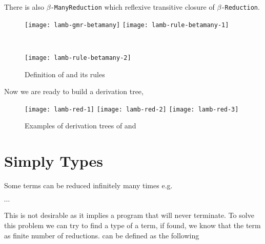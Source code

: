 \documentclass[master.tex]{subfiles}
\begin{document}
\newpage

There is also \texttt{$\beta$-ManyReduction} which reflexive transitive closure
of \texttt{$\beta$-Reduction}.

\begin{figure}[H]
    \centering
\begin{minipage}{0.48\textwidth}
\begin{flushleft}
\texttt{[image: lamb-gmr-betamany]}
\texttt{[image: lamb-rule-betamany-1]}
\end{flushleft}
\end{minipage}
~
\begin{minipage}{0.48\textwidth}
\begin{flushright}
\texttt{[image: lamb-rule-betamany-2]}
\end{flushright}
\end{minipage}

\caption{Definition of  and its rules}
\end{figure}

Now we are ready to build a derivation tree,

\begin{figure}[H]
    \centering
\begin{minipage}{\textwidth}
    \texttt{[image: lamb-red-1]}
    \texttt{[image: lamb-red-2]}
    \texttt{[image: lamb-red-3]}
\end{minipage}
\caption{Examples of derivation trees of  and }
\end{figure}

\section{Simply Types}

Some terms can be reduced infinitely many times e.g.
  \\
 
  \\
 
  $\cdots$

This is not desirable as it implies a program that will never terminate. To
solve this problem we can try to find a type of a term, if found, we know that
the term as finite number of reductions.  can be defined as the
following
\end{document}
